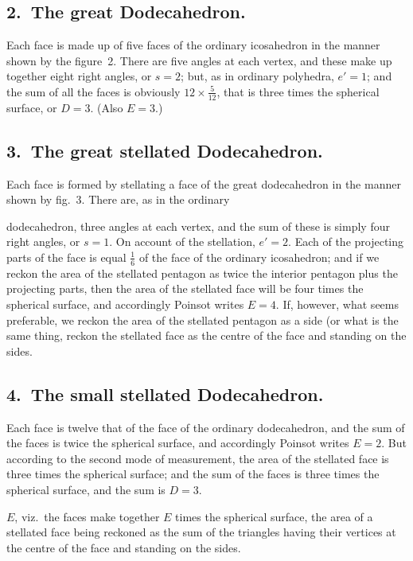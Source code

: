 \documentclass[11pt,a4paper]{article}
\begin{document}
\setcounter{page}{82}

\subsection*{2.\ The great Dodecahedron.}
Each face is made up of five faces of the ordinary icosahedron in the manner shown by the figure~2. There are five angles at each vertex, and these make up together eight right angles, or $s=2$; but, as in ordinary polyhedra, $e'=1$; and the sum of all the faces is obviously $12 \times \tfrac{5}{12}$, that is three times the spherical surface, or $D=3$. (Also $E=3$.)

\subsection*{3.\ The great stellated Dodecahedron.}
Each face is formed by stellating a face of the great dodecahedron in the manner shown by fig.~3. There are, as in the ordinary

\setcounter{page}{83}

dodecahedron, three angles at each vertex, and the sum of these is simply four right angles, or $s=1$. On account of the stellation, $e'=2$. Each of the projecting parts of the face is equal $\tfrac{1}{6}$ of the face of the ordinary icosahedron; and if we reckon the area of the stellated pentagon as twice the interior pentagon plus the projecting parts, then the area of the stellated face will be four times the spherical surface, and accordingly Poinsot writes $E=4$. If, however, what seems preferable, we reckon the area of the stellated pentagon as a side (or what is the same thing, reckon the stellated face as the centre of the face and standing on the sides.

\subsection*{4.\ The small stellated Dodecahedron.}
Each face is twelve that of the face of the ordinary dodecahedron, and the sum of the faces is twice the spherical surface, and accordingly Poinsot writes $E = 2$. But according to the second mode of measurement, the area of the stellated face is three times the spherical surface; and the sum of the faces is three times the spherical surface, and the sum is $D=3$.

\setcounter{page}{84}

$E$, viz.\ the faces make together $E$ times the spherical surface, the area of a stellated face being reckoned as the sum of the triangles having their vertices at the centre of the face and standing on the sides.
\end{document}
